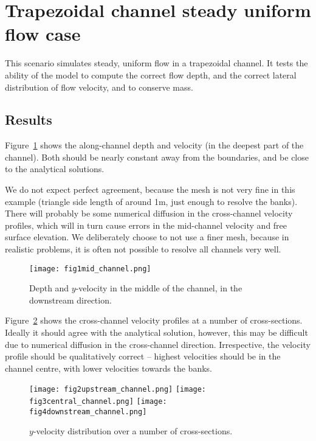 \section{Trapezoidal channel steady uniform flow case}
This scenario simulates steady, uniform flow in a trapezoidal channel. It tests the ability of the model to compute the correct flow depth, and the correct lateral distribution of flow velocity, and to conserve mass.

\subsection{Results}
Figure~\ref{fig:fig1mid_channel} shows the along-channel depth and velocity (in the deepest part of the channel). Both should be nearly constant away from the boundaries, and be close to the analytical solutions. 

We do not expect perfect agreement, because the mesh is not very fine in this example (triangle side length of around 1m, just enough to resolve the banks). There will probably be some numerical diffusion in the cross-channel velocity profiles, which will in turn cause errors in the mid-channel velocity and free surface elevation. We deliberately choose to not use a finer mesh, because in realistic problems, it is often not possible to resolve all channels very well.

\begin{figure}[h]
\begin{center}
\texttt{[image: fig1mid\_channel.png]}
\caption{Depth and $y$-velocity in the middle of the channel, in the downstream direction.}
\label{fig:fig1mid_channel}
\end{center}
\end{figure}

Figure~\ref{fig:xsect_vels} shows the cross-channel velocity profiles at a number of cross-sections. Ideally it should agree with the analytical solution, however, this may be difficult due to numerical diffusion in the cross-channel direction. Irrespective, the velocity profile should be qualitatively correct -- highest velocities should be in the channel centre, with lower velocities towards the banks.

\begin{figure}[h]
\begin{center}
\texttt{[image: fig2upstream\_channel.png]}
\texttt{[image: fig3central\_channel.png]}
\texttt{[image: fig4downstream\_channel.png]}
\caption{$y$-velocity distribution over a number of cross-sections.}
\label{fig:xsect_vels}
\end{center}
\end{figure}

